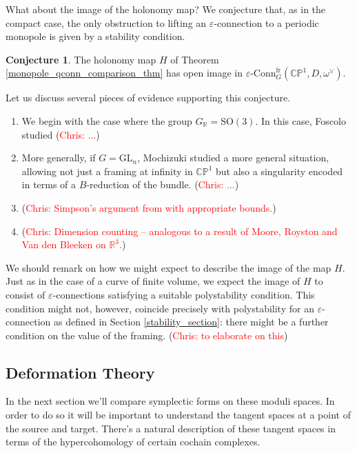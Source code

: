 \documentclass[11pt, oneside, reqno]{amsart}
\theoremstyle{definition} \newtheorem{definition}{Definition}[section]
\newtheorem{conjecture}[definition]{Conjecture}
\theoremstyle{definition} \newtheorem{remark}[definition]{Remark}
\theoremstyle{definition} \newtheorem{remarks}[definition]{Remarks}
\theoremstyle{definition} \newtheorem{question}[definition]{Question}
\theoremstyle{definition} \newtheorem*{note}{Note}
\theoremstyle{definition} \newtheorem{example}[definition]{Example}
\theoremstyle{definition} \newtheorem{examples}[definition]{Examples}
\newcommand{\bb}[1]{\mathbb{#1}}
\newcommand{\RR}{\mathbb{R}}
\newcommand{\eps}{\varepsilon}
\newcommand{\SO}{\mathrm{SO}}
\newcommand{\GL}{\mathrm{GL}}
\newcommand{\epsconn}{\varepsilon\text{-Conn}}
\newcommand{\chris}[1]{(\textcolor{red}{Chris: #1})}
\begin{document}
What about the image of the holonomy map? We conjecture that, as in the compact case, the only obstruction to lifting an $\eps$-connection to a periodic monopole is given by a stability condition.

\begin{conjecture} \label{open_image_conjecture}
The holonomy map $H$ of Theorem \ref{monopole_qconn_comparison_thm} has open image in $\epsconn_G^{\text{fr}}(\bb{CP}^1, D, \omega^\vee)$.
\end{conjecture}

Let us discuss several pieces of evidence supporting this conjecture.
\begin{enumerate}
 \item We begin with the case where the group $G_\RR = \SO(3)$.  In this case, Foscolo \cite{FoscoloDef, FoscoloGluing} studied \chris{...}
 
 \item More generally, if $G = \GL_n$, Mochizuki \cite{Mochizuki} studied a more general situation, allowing not just a framing at infinity in $\bb{CP}^1$ but also a singularity encoded in terms of a $B$-reduction of the bundle. \chris{...}
 
 \item \chris{Simpson's argument from \cite{Simpson} with appropriate bounds.}
 
 \item \chris{Dimension counting -- analogous to a result of Moore, Royston and Van den Bleeken \cite{MooreRoystonVandenBleeken} on $\RR^3$.}
\end{enumerate}

We should remark on how we might expect to describe the image of the map $H$.  Just as in the case of a curve of finite volume, we expect the image of $H$ to consist of $\eps$-connections satisfying a suitable polystability condition.  This condition might not, however, coincide precisely with polystability for an $\eps$-connection as defined in Section \ref{stability_section}: there might be a further condition on the value of the framing.  \chris{to elaborate on this}

\subsection{Deformation Theory} \label{def_section}
In the next section we'll compare symplectic forms on these moduli spaces.  In order to do so it will be important to understand the tangent spaces at a point of the source and target.  There's a natural description of these tangent spaces in terms of the hypercohomology of certain cochain complexes.
\end{document}
